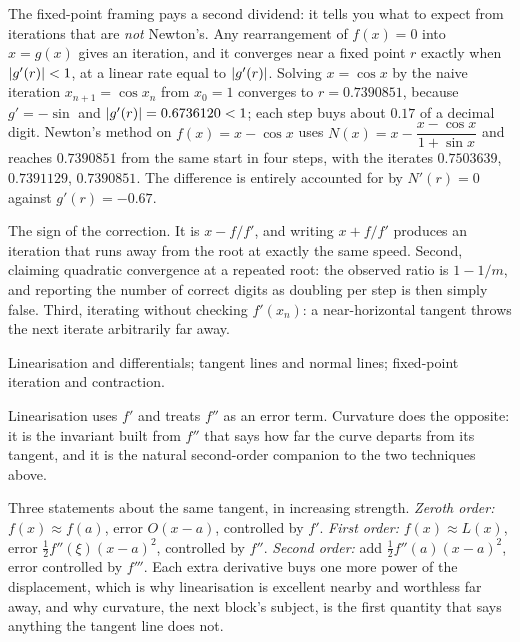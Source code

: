 The fixed-point framing pays a second dividend: it tells you what to expect from iterations that are \emph{not} Newton's. Any rearrangement of $f(x)=0$ into $x=g(x)$ gives an iteration, and it converges near a fixed point $r$ exactly when $\left\lvert g'(r)\right\rvert<1$, at a linear rate equal to $\left\lvert g'(r)\right\rvert$. Solving $x=\cos x$ by the naive iteration $x_{n+1}=\cos x_{n}$ from $x_{0}=1$ converges to $r=0.7390851$, because $g'=-\sin$ and $\left\lvert g'(r)\right\rvert=0.6736120<1$; each step buys about $0.17$ of a decimal digit. Newton's method on $f(x)=x-\cos x$ uses $N(x)=x-\dfrac{x-\cos x}{1+\sin x}$ and reaches $0.7390851$ from the same start in four steps, with the iterates $0.7503639$, $0.7391129$, $0.7390851$. The difference is entirely accounted for by $N'(r)=0$ against $g'(r)=-0.67$.

\begin{trap}
The sign of the correction. It is $x-f/f'$, and writing $x+f/f'$ produces an iteration that runs away from the root at exactly the same speed. Second, claiming quadratic convergence at a repeated root: the observed ratio is $1-1/m$, and reporting the number of correct digits as doubling per step is then simply false. Third, iterating without checking $f'(x_{n})$: a near-horizontal tangent throws the next iterate arbitrarily far away.
\end{trap}

\begin{seealsob}Linearisation and differentials; tangent lines and normal lines; fixed-point iteration and contraction.\end{seealsob}

Linearisation uses $f'$ and treats $f''$ as an error term. Curvature does the opposite: it is the invariant built from $f''$ that says how far the curve departs from its tangent, and it is the natural second-order companion to the two techniques above.

\begin{keynote}
Three statements about the same tangent, in increasing strength. \emph{Zeroth order:} $f(x)\approx f(a)$, error $O(x-a)$, controlled by $f'$. \emph{First order:} $f(x)\approx L(x)$, error $\tfrac12f''(\xi)(x-a)^{2}$, controlled by $f''$. \emph{Second order:} add $\tfrac12f''(a)(x-a)^{2}$, error controlled by $f'''$. Each extra derivative buys one more power of the displacement, which is why linearisation is excellent nearby and worthless far away, and why curvature, the next block's subject, is the first quantity that says anything the tangent line does not.
\end{keynote}

